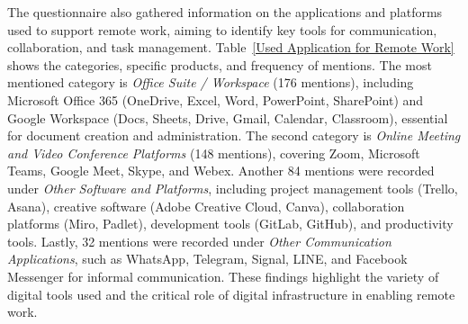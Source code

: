 \documentclass[conference]{IEEEtran}
\begin{document}
The questionnaire also gathered information on the applications and platforms used to support remote work, aiming to identify key tools for communication, collaboration, and task management. Table~\ref{Used Application for Remote Work} shows the categories, specific products, and frequency of mentions. The most mentioned category is \textit{Office Suite / Workspace} (176 mentions), including Microsoft Office 365 (OneDrive, Excel, Word, PowerPoint, SharePoint) and Google Workspace (Docs, Sheets, Drive, Gmail, Calendar, Classroom), essential for document creation and administration. The second category is \textit{Online Meeting and Video Conference Platforms} (148 mentions), covering Zoom, Microsoft Teams, Google Meet, Skype, and Webex. Another 84 mentions were recorded under \textit{Other Software and Platforms}, including project management tools (Trello, Asana), creative software (Adobe Creative Cloud, Canva), collaboration platforms (Miro, Padlet), development tools (GitLab, GitHub), and productivity tools. Lastly, 32 mentions were recorded under \textit{Other Communication Applications}, such as WhatsApp, Telegram, Signal, LINE, and Facebook Messenger for informal communication. These findings highlight the variety of digital tools used and the critical role of digital infrastructure in enabling remote work.
\end{document}
